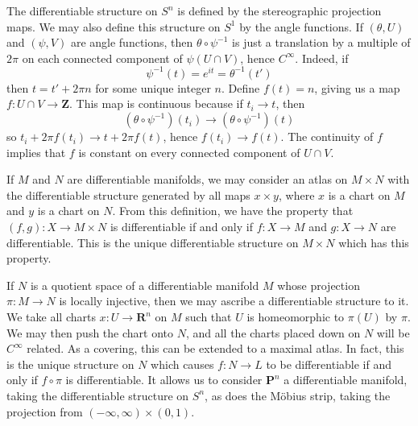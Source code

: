 \begin{example}
    The differentiable structure on $S^n$ is defined by the stereographic projection maps. We may also define this structure on $S^1$ by the angle functions. If $(\theta,U)$ and $(\psi,V)$ are angle functions, then $\theta \circ \psi^{-1}$ is just a translation by a multiple of $2\pi$ on each connected component of $\psi(U \cap V)$, hence $C^\infty$. Indeed, if
    \[ \psi^{-1}(t) = e^{it} = \theta^{-1}(t') \]
    then $t = t' + 2 \pi n$ for some unique integer $n$. Define $f(t) = n$, giving us a map $f: U \cap V \to \mathbf{Z}$. This map is continuous because if $t_i \to t$, then
    \[ (\theta \circ \psi^{-1})(t_i) \to (\theta \circ \psi^{-1})(t) \]
    so $t_i + 2 \pi f(t_i) \to t + 2 \pi f(t)$, hence $f(t_i) \to f(t)$. The continuity of $f$ implies that $f$ is constant on every connected component of $U \cap V$.
\end{example}

\begin{example}
    If $M$ and $N$ are differentiable manifolds, we may consider an atlas on $M \times N$ with the differentiable structure generated by all maps $x \times y$, where $x$ is a chart on $M$ and $y$ is a chart on $N$. From this definition, we have the property that $(f,g): X \to M \times N$ is differentiable if and only if $f: X \to M$ and $g: X \to N$ are differentiable. This is the unique differentiable structure on $M \times N$ which has this property.
\end{example}

\begin{example}
    If $N$ is a quotient space of a differentiable manifold $M$ whose projection $\pi:M \to N$ is locally injective, then we may ascribe a differentiable structure to it. We take all charts $x:U \to \mathbf{R}^n$ on $M$ such that $U$ is homeomorphic to $\pi(U)$ by $\pi$. We may then push the chart onto $N$, and all the charts placed down on $N$ will be $C^\infty$ related. As a covering, this can be extended to a maximal atlas. In fact, this is the unique structure on $N$ which causes $f: N \to L$ to be differentiable if and only if $f \circ \pi$ is differentiable. It allows us to consider $\mathbf{P}^n$ a differentiable manifold, taking the differentiable structure on $S^n$, as does the M\"{o}bius strip, taking the projection from $(-\infty, \infty) \times (0,1)$.
\end{example}

